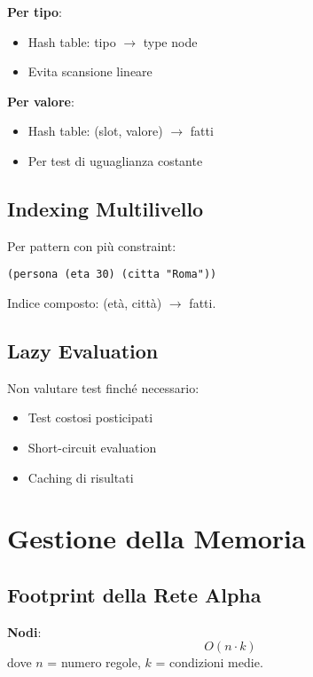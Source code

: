 \textbf{Per tipo}:
\begin{itemize}
\item Hash table: tipo $\rightarrow$ type node
\item Evita scansione lineare
\end{itemize}

\textbf{Per valore}:
\begin{itemize}
\item Hash table: (slot, valore) $\rightarrow$ fatti
\item Per test di uguaglianza costante
\end{itemize}

\subsection{Indexing Multilivello}

Per pattern con più constraint:

\begin{lstlisting}[language=CLIPS]
(persona (eta 30) (citta "Roma"))
\end{lstlisting}

Indice composto: (età, città) $\rightarrow$ fatti.

\subsection{Lazy Evaluation}

Non valutare test finché necessario:

\begin{itemize}
\item Test costosi posticipati
\item Short-circuit evaluation
\item Caching di risultati
\end{itemize}

\section{Gestione della Memoria}

\subsection{Footprint della Rete Alpha}

\textbf{Nodi}:
\begin{equation}
O(n \cdot k)
\end{equation}
dove $n$ = numero regole, $k$ = condizioni medie.


